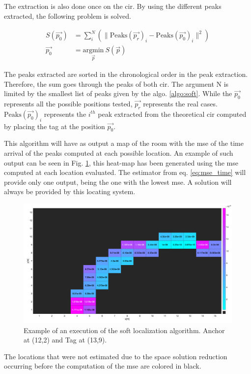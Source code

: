 The extraction is also done once on the \gls{cir}. By using the different peaks extracted, the following problem is solved. 

\begin{equation}
\label{eq:mse_time}
\begin{aligned}
S(\vec{p_0}) &= \sum_i^N (\|\text{Peaks}(\vec{p_{r}})_i - \text{Peaks}(\vec{p_{0}})_i\| ^2 ) \\
\vec{p_0} &= \underset{\vec{p}}{\text{argmin}}~ S(\vec{p})
\end{aligned}
\end{equation}

The peaks extracted are sorted in the chronological order in the peak extraction. Therefore, the sum goes through the peaks of both \gls{cir}. The argument $\text{N}$ is limited by the smallest list of peaks given by the algo. \ref{algo:soft}. While the $\vec{p_0}$ represents all the possible positions tested, $\vec{p_r}$ represents the real cases. $\text{Peaks}(\vec{p_0})_i$ represents the $i^{th}$ peak extracted from the theoretical \gls{cir} computed by placing the tag at the position $\vec{p_0}$.
\vspace{2mm}

This algorithm will have as output a map of the room with the \gls{mse} of the time arrival of the peaks computed at each possible location. An example of such output can be seen in Fig. \ref{fig:mse_example}, this heat-map has been generated using the \gls{mse} computed at each location evaluated. The estimator from eq. \ref{eq:mse_time} will provide only one output, being the one with the lowest \gls{mse}. A solution will always be provided by this locating system. 
\vspace{2mm}

\begin{figure}[H]
\centering
\includegraphics[width=\linewidth]{Images/mse_map_algo.png}
\caption{Example of an execution of the soft localization algorithm. Anchor at (12,2) and Tag at (13,9).\label{fig:mse_example}}
\end{figure}

The locations that were not estimated due to the space solution reduction occurring before the computation of the \gls{mse} are colored in black.